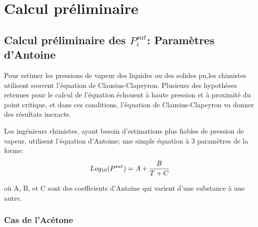 \chapter{Calcul préliminaire}
\section{Calcul préliminaire des $P_i^{sat}$: Paramètres d'Antoine }
Pour estimer les pressions de vapeur des liquides ou des solides pu,les chimistes utilisent souvent l'équation de Clausius-Clapeyron. Plusieurs des hypothèses retenues pour le calcul de l'équation échouent à haute pression et à proximité du point critique, et dans ces conditions, l'équation de Clausius-Clapeyron va donner des résultats inexacts.

Les ingénieurs chimistes, ayant besoin d'estimations plus fiables de pression de vapeur, utilisent l'équation d'Antoine; une simple équation à 3 paramètres de la forme:\\

\begin{equation}
Log_{10}( P^{sat} ) = A + \cfrac{B}{T+C} \\
\end{equation}

où A, B, et C sont des coefficients d'Antoine qui varient d'une substance à une autre.
\subsection{Cas de l'Acétone}

